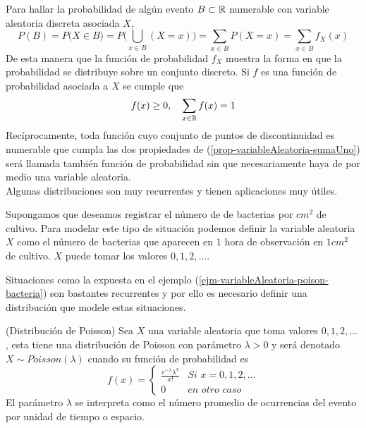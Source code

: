 Para hallar la probabilidad de algún evento $B\subset{\mathbb{R}}$ numerable con variable aleatoria discreta asociada $X$,
$$P(B)=P\big(X\in B)=P\big(\bigcup_{x\in B}(X=x)\big)=\sum_{x\in B}P(X=x)=\sum_{x\in B}f_X(x)$$
De esta manera que la función de probabilidad $f_X$ muestra la forma en que la probabilidad se distribuye sobre un conjunto discreto. Si $f$ es una función de probabilidad asociada a $X$ se cumple que 
\begin{eqnarray}
    f(x)\geq 0,\quad\sum_{x\in {\mathbb{R}}}f(x)=1 \label{prop-variableAleatoria-sumaUno}
\end{eqnarray}
Recíprocamente, toda función cuyo conjunto de puntos de discontinuidad es numerable que cumpla las dos propiedades de (\ref{prop-variableAleatoria-sumaUno}) será llamada también función de probabilidad sin que necesariamente haya de por medio una variable aleatoria.\\
Algunas distribuciones son muy recurrentes y tienen aplicaciones muy útiles.
\begin{Ejm}
\label{ejm-variableAleatoria-poison-bacteria}
    Supongamos que deseamos  registrar el número de de bacterias por $cm^2$ de cultivo. Para modelar este tipo de situación podemos definir la variable aleatoria $X$ como el número de bacterias que aparecen en $1$ hora de observación en $1 cm^2$ de cultivo. $X$ puede tomar los valores $0,1,2,\ldots$.
\end{Ejm}
Situaciones como la expuesta en el ejemplo  (\ref{ejm-variableAleatoria-poison-bacteria}) son bastantes recurrentes y por ello es necesario definir una distribución que modele estas situaciones.
\begin{Def}(Distribución de Poisson)
    Sea $X$ una variable aleatoria que toma valores $0,1,2,\ldots$ , esta tiene una distribución de Poisson con parámetro $\lambda>0$ y será denotado $X\sim Poisson(\lambda)$ cuando su función de probabilidad es
    $$f(x)=\begin{cases}\frac{e^{-\lambda}\lambda^x}{x!}& \textit{Si }x=0,1,2,\ldots\\
    0 &\textit{en otro caso}
    \end{cases}$$
    El parámetro $\lambda$ se interpreta como el número promedio de ocurrencias del evento por unidad de tiempo o espacio.
\end{Def}
